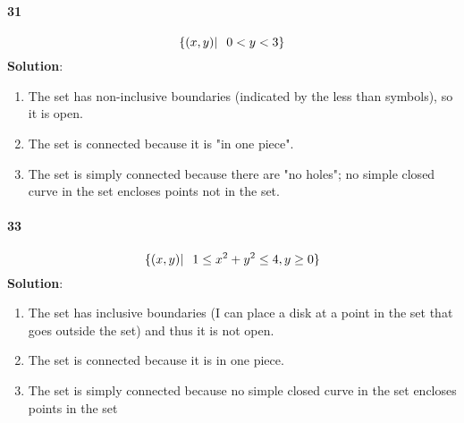 \documentclass{article}
\begin{document}
    \paragraph{31}
    \[ \{(x,y)|\hspace{0.1in} 0 < y < 3\}\]
    \textbf{Solution}:
    \begin{enumerate}[label=(\alph*)]
        \item The set has non-inclusive boundaries (indicated by the less than symbols), so it is open.
        \item The set is connected because it is "in one piece".
        \item The set is simply connected because there are "no holes"; no simple closed curve in the set encloses points not in the set.
    \end{enumerate}

    \paragraph{33}
    \[ \{(x,y)|\hspace{0.1in} 1 \leq x^2 + y^2 \leq 4, y \geq 0\}\]
    \textbf{Solution}:
    \begin{enumerate}[label=(\alph*)]
        \item The set has inclusive boundaries (I can place a disk at a point in the set that goes outside the set) and thus it is not open.
        \item The set is connected because it is in one piece.
        \item The set is simply connected because no simple closed curve in the set encloses points in the set
    \end{enumerate}
\end{document}
